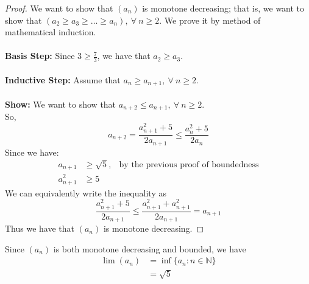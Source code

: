 \documentclass[12pt,letterpaper]{article}
\newcommand{\N}{\mathbb{N}}
\theoremstyle{case}
\theoremstyle{definition}
\begin{document}
\begin{enumerate}
\begin{enumerate}
		\begin{proof}
			We want to show that $(a_n)$ is monotone decreasing; that is, we want to show that $(a_2 \geq a_3 \geq \dots \geq a_n),\ \forall\ n \geq 2$. We prove it by method of mathematical induction.
			\\\\\textbf{Basis Step:} Since $3 \geq \frac{7}{3}$, we have that $a_2 \geq a_3$.
			\\\\\textbf{Inductive Step:} Assume that $a_n \geq a_{n+1},\ \forall\ n \geq 2$.
			\\\\\textbf{Show:} We want to show that $a_{n+2} \leq a_{n+1},\ \forall\ n \geq 2$.
			\\So,
			\[a_{n+2} = \frac{a_{n+1}^2+5}{2a_{n+1}} \leq \frac{a_n^2+5}{2a_n}\]
			Since we have:
			\begin{align*}
				a_{n+1} &\geq \sqrt{5}, &\text{by the previous proof of boundedness} \\
				a_{n+1}^2 &\geq 5
			\end{align*}
			We can equivalently write the inequality as
			\[\frac{a_{n+1}^2+5}{2a_{n+1}} \leq \frac{a_{n+1}^2+a_{n+1}^2}{2a_{n+1}}=a_{n+1}\]
			Thus we have that $(a_n)$ is monotone decreasing.
		\end{proof}
		Since $(a_n)$ is both monotone decreasing and bounded, we have
		\begin{align*}
			\lim (a_n) &= \inf \{a_n:n \in \N\} \\
			&= \sqrt{5}
		\end{align*} 
		

\end{enumerate}
\end{enumerate}
\end{document}
